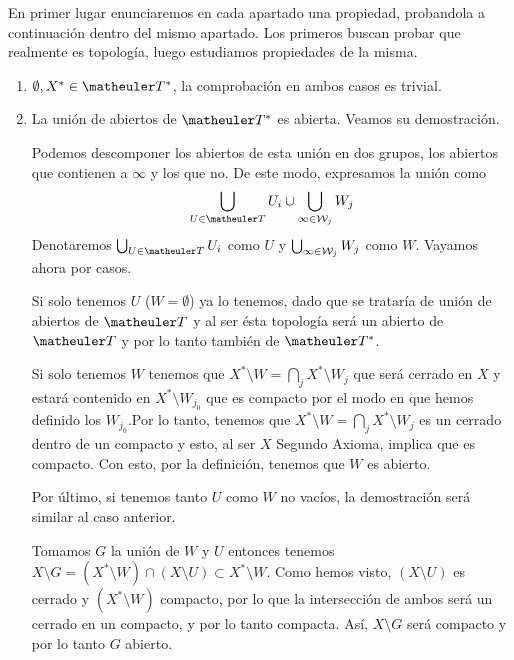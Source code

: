 \begin{obs}En primer lugar enunciaremos en cada apartado una propiedad, probandola a continuación dentro del mismo apartado. Los primeros buscan probar que realmente es topología, luego estudiamos propiedades de la misma.
	 
	\begin{enumerate}
	\item $\emptyset,X^*\in \T^*$, la comprobación en ambos casos es trivial. 
	\item La unión de abiertos de $\T^*$ es abierta. Veamos su demostración.
	
	Podemos descomponer los abiertos de esta unión en dos grupos, los abiertos que contienen a $\infty$ y los que no. De este modo, expresamos la unión como 
	\begin{equation}
		\bigcup_{U\in\T}U_i \cup \bigcup_{\infty\in\W_j}W_j
	\end{equation}
	Denotaremos $\bigcup_{U\in\T}U_i$ como $U$ y $\bigcup_{\infty\in\mathcal{W}_j}W_j$ como $W$. Vayamos ahora por casos.
	
	Si solo tenemos $U$ ($W=\emptyset$) ya lo tenemos, dado que se trataría de unión de abiertos de $\T$ y al ser ésta topología será un abierto de $\T$ y por lo tanto también de $\T^*$.
	
	
	Si solo tenemos $W$ tenemos que $X^*\setminus W=\bigcap_j X^*\setminus W_j$ que será cerrado en $X$ y estará contenido en $X^*\setminus W_{j_0}$ que es compacto por el modo en que hemos definido los $W_{j_0}$.Por lo tanto, tenemos que  $X^*\setminus W=\bigcap_j X^*\setminus W_j$ es un cerrado dentro de un compacto y esto, al ser $X$ Segundo Axioma, implica que es compacto. Con esto, por la definición, tenemos que $W$ es abierto.
	
	Por último, si tenemos tanto $U$ como $W$ no vacíos, la demostración será similar al caso anterior. 
	
	Tomamos $G$ la unión de $W$ y $U$ entonces tenemos $X\setminus G= (X^*\setminus W)\cap(X\setminus U)\subset X^*\setminus W$.
	Como hemos visto, $(X\setminus U)$ es cerrado y $(X^*\setminus W)$ compacto, por lo que la intersección de ambos será un cerrado en un compacto, y por lo tanto compacta. Así, $X\setminus G$ será compacto y por lo tanto $G$ abierto.
	

\end{enumerate}
\end{obs}
